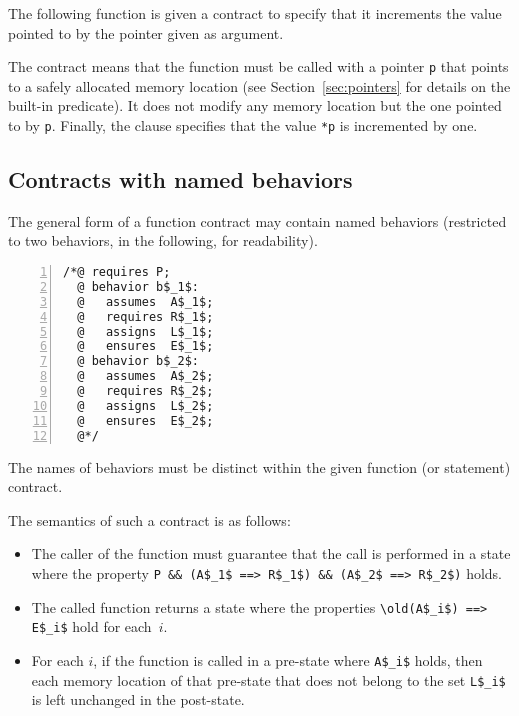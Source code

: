 \begin{example}
  The following function is given a contract to specify that it increments
  the value pointed to by the pointer given as argument.

%
  The contract means that the function must be called with a pointer
  \lstinline|p| that points to a safely allocated memory location (see
  Section~\ref{sec:pointers} for details on the \valid built-in
  predicate). It does not modify any memory location but the one
  pointed to by \lstinline|p|. Finally, the \ensures clause specifies that
  the value \lstinline!*p! is incremented by one.
\end{example}

\subsection{Contracts with named behaviors}
\label{subsec:behaviors}
The general form of a function contract may contain named
behaviors (restricted to two behaviors, in the following, for
readability).
\lstset{firstnumber=auto}
\begin{lstlisting}[style=c,basicstyle=\lp@basic,numbers=left,name=behaviors]
/*@ requires P;
  @ behavior b$_1$:
  @   assumes  A$_1$;
  @   requires R$_1$;
  @   assigns  L$_1$;
  @   ensures  E$_1$;
  @ behavior b$_2$:
  @   assumes  A$_2$;
  @   requires R$_2$;
  @   assigns  L$_2$;
  @   ensures  E$_2$;
  @*/
\end{lstlisting}
The names of behaviors must be distinct within the given function (or statement) contract.

The semantics of such a contract is as follows:
\begin{itemize}
\item The caller of the function must guarantee that the call is
  performed in a state where the property
  \lstinline|P && (A$_1$ ==> R$_1$) && (A$_2$ ==> R$_2$)| holds.
\item The called function returns a state where
the properties \lstinline|\old(A$_i$) ==> E$_i$| hold for each~$i$.
\item For each $i$, if the function is called in a pre-state where
  \lstinline|A$_i$| holds, then each memory location of that pre-state 
  that does not belong to the set \lstinline|L$_i$| is left unchanged in 
  the post-state.
\end{itemize}


